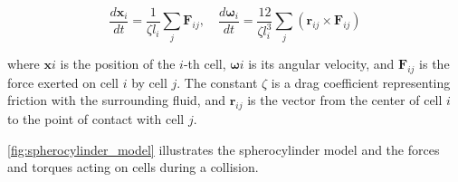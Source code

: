 \documentclass[conference]{IEEEtran}
\begin{document}
\begin{equation}
    \frac{d \mathbf{x}_i}{dt} = \frac{1}{\zeta l_i} \sum_j \mathbf{F}_{ij}, \quad \frac{d \boldsymbol{\omega}_i}{dt} = \frac{12}{\zeta l_i^3} \sum_j (\mathbf{r}_{ij} \times \mathbf{F}_{ij})
\end{equation}
\label{eq:overdamped_langevin}

where $\mathbf{x}i$ is the position of the $i$-th cell, $\boldsymbol{\omega}i$ is its angular velocity, and $\mathbf{F}_{ij}$ is the force exerted on cell $i$ by cell $j$. The constant $\zeta$ is a drag coefficient representing friction with the surrounding fluid, and $\mathbf{r}_{ij}$ is the vector from the center of cell $i$ to the point of contact with cell $j$.

\autoref{fig:spherocylinder_model} illustrates the spherocylinder model and the forces and torques acting on cells during a collision.
\end{document}
